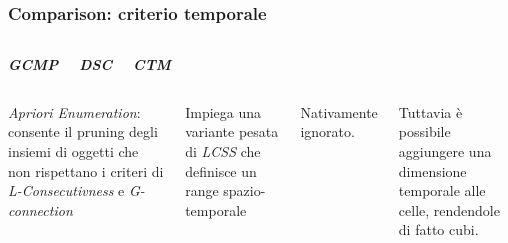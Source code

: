 \documentclass{beamer}
\begin{document}
\begin{frame}
	\frametitle{Comparison: criterio temporale}
	\begin{columns}
		
		\begin{center}
			\textbf{\textit{\huge{GCMP}}}
			
		\end{center}
		
		\begin{center}
			\textbf{\textit{\huge{DSC}}}
			
		\end{center}
		
		\begin{center}
			\textbf{\textit{\huge{CTM}}}
			
		\end{center}
	\end{columns}
	\begin{columns}
		
		\column{.3\columnwidth}
		
		\textit{Apriori Enumeration}: consente il pruning degli insiemi di oggetti
		che non rispettano i criteri di \textit{L-Consecutivness} e \textit{G-connection}
		
		
		\column{.3\textwidth}
		
		Impiega una variante pesata di \textit{LCSS} che definisce un range spazio-temporale
		
		\column{.3\textwidth}
		Nativamente ignorato.
		
		Tuttavia è possibile aggiungere una dimensione temporale alle celle, rendendole di fatto cubi.
		
	\end{columns}
\end{frame}    
\end{document}
